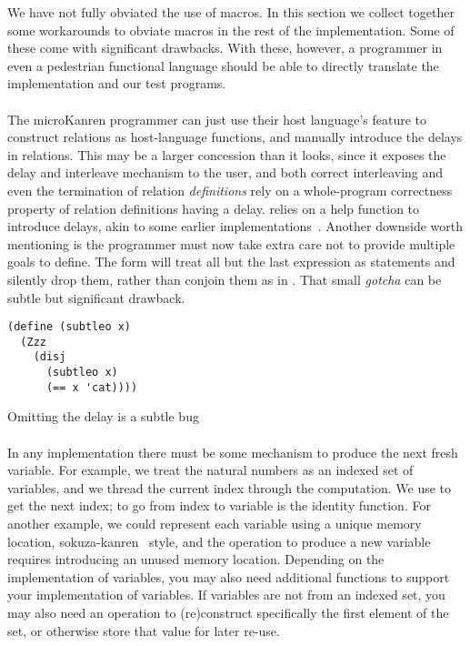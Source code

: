 \documentclass[sigplan,draft,balance,pbalance,natbib=false]{acmart}
\begin{document}
We have not fully obviated the use of macros. In this section we
collect together some workarounds to obviate macros in the rest of the
implementation. Some of these come with significant drawbacks. With
these, however, a programmer in even a pedestrian functional language
should be able to directly translate the implementation and our test
programs.

\paragraph{}

The microKanren programmer can just use their host
language's  feature to construct relations as
host-language functions, and manually introduce the delays in
relations. This may be a larger concession than it looks, since it
exposes the delay and interleave mechanism to the user, and both
correct interleaving and even the termination of relation
\emph{definitions} rely on a whole-program correctness property of
relation definitions having a delay.  relies on a
help function  to introduce delays, akin to some
earlier implementations~\cite{hemann2013muKanren}. Another downside
worth mentioning is the programmer must now take extra care not to
provide multiple goals to define. The  form will
treat all but the last expression as statements and silently drop
them, rather than conjoin them as in . That small
\emph{gotcha} can be subtle but significant drawback.

\begin{listing}
  \begin{verbatim}
(define (subtleo x)
  (Zzz
    (disj
      (subtleo x)
      (== x 'cat))))
  \end{verbatim}
  \caption{Omitting the delay is a subtle bug}
  \label{mnt:subtleo}
\end{listing}

\paragraph{}

In any implementation there must be
some mechanism to produce the next fresh variable. For example, we
treat the natural numbers as an indexed set of variables, and we
thread the current index through the computation. We use
 to get the next index; to go from index to variable
is the identity function. For another example, we could represent each
variable using a unique memory location,
sokuza-kanren~\cite{kiselyov2006taste} style, and the operation to
produce a new variable requires introducing an unused memory location.
Depending on the implementation of variables, you may also need
additional functions to support your implementation of variables. If
variables are not from an indexed set, you may also need an operation
to (re)construct specifically the first element of the set, or
otherwise store that value for later re-use.
\end{document}
